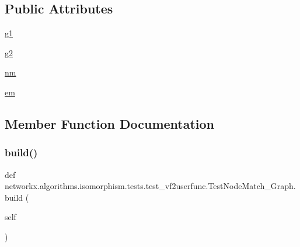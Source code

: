 \subsection*{Public Attributes}
\begin{DoxyCompactItemize}
\item 
\hyperlink{classnetworkx_1_1algorithms_1_1isomorphism_1_1tests_1_1test__vf2userfunc_1_1TestNodeMatch__Graph_a34b480f6660033f75592938f8060ee81}{g1}
\item 
\hyperlink{classnetworkx_1_1algorithms_1_1isomorphism_1_1tests_1_1test__vf2userfunc_1_1TestNodeMatch__Graph_a49bb45f2ef9af3035e5e307699ed5c6c}{g2}
\item 
\hyperlink{classnetworkx_1_1algorithms_1_1isomorphism_1_1tests_1_1test__vf2userfunc_1_1TestNodeMatch__Graph_a48e1db0a1c5ed582c98fdf53aba08aa5}{nm}
\item 
\hyperlink{classnetworkx_1_1algorithms_1_1isomorphism_1_1tests_1_1test__vf2userfunc_1_1TestNodeMatch__Graph_af9c9f889b7e278523d55e193027c4ada}{em}
\end{DoxyCompactItemize}


\subsection{Member Function Documentation}
\mbox{\label{classnetworkx_1_1algorithms_1_1isomorphism_1_1tests_1_1test__vf2userfunc_1_1TestNodeMatch__Graph_a3a22f628055c42cbff616d7b006f844b}} 
\subsubsection{\texorpdfstring{build()}{build()}}
{\footnotesize\ttfamily def networkx.\+algorithms.\+isomorphism.\+tests.\+test\+\_\+vf2userfunc.\+Test\+Node\+Match\+\_\+\+Graph.\+build (\begin{DoxyParamCaption}\item[{}]{self }\end{DoxyParamCaption})}

